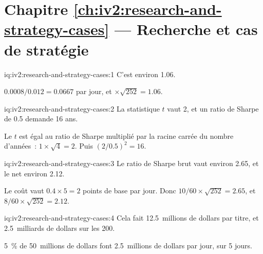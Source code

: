 \section*{Chapitre \ref{ch:iv2:research-and-strategy-cases} --- Recherche et cas de stratégie}

\begin{solution}{iq:iv2:research-and-strategy-cases:1}
C'est environ 1.06.

$0.0008/0.012 = 0.0667$ par jour, et $\times\sqrt{252} = 1.06$.

\end{solution}

\begin{solution}{iq:iv2:research-and-strategy-cases:2}
La statistique $t$ vaut 2, et un ratio de Sharpe de 0.5 demande 16 ans.

Le $t$ est égal au ratio de Sharpe multiplié par la racine carrée du nombre d'années~: $1 \times \sqrt{4} = 2$. Puis $(2/0.5)^2 = 16$.

\end{solution}

\begin{solution}{iq:iv2:research-and-strategy-cases:3}
Le ratio de Sharpe brut vaut environ 2.65, et le net environ 2.12.

Le coût vaut $0.4 \times 5 = 2$ points de base par jour. Donc $10/60 \times \sqrt{252} = 2.65$, et $8/60 \times \sqrt{252} = 2.12$.

\end{solution}

\begin{solution}{iq:iv2:research-and-strategy-cases:4}
Cela fait 12.5~millions de dollars par titre, et 2.5~milliards de dollars sur les 200.

5~\% de 50~millions de dollars font 2.5~millions de dollars par jour, sur 5 jours.

\end{solution}

